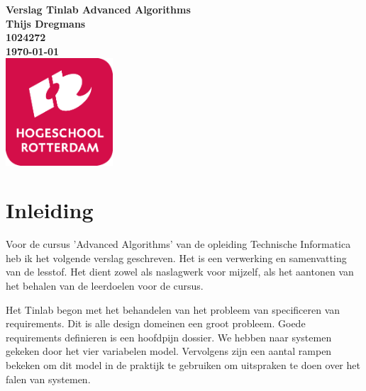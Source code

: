 \documentclass{article}
\begin{document}
	\sffamily
	
	\begin{titlepage}
	
		\centering
		  \vfill
		  {\bfseries\Huge
		    Verslag Tinlab Advanced Algorithms \\
		      \vskip2cm
		    }
		    {\bfseries\Large
		      Thijs Dregmans\\
		    }
		    {
		      \bfseries\normalsize
		      1024272\\
		      \vskip1cm
		      \today\\
		  }    
		  \vfill
		  \includegraphics[width=4cm]{logohr.png} %
		  \vfill
		  \vfill
	    
	\end{titlepage}
	
	\newpage
	
	
	\tableofcontents
	
	\newpage
	
	
	\section{Inleiding}
	
	Voor de cursus 'Advanced Algorithms' van de opleiding Technische Informatica heb ik het volgende verslag geschreven. Het is een verwerking en samenvatting van de lesstof. Het dient zowel als naslagwerk voor mijzelf, als het aantonen van het behalen van de leerdoelen voor de cursus.
	
	Het Tinlab begon met het behandelen van het probleem van specificeren van requirements. Dit is alle design domeinen een groot probleem. Goede requirements definieren is een hoofdpijn dossier. We hebben naar systemen gekeken door het vier variabelen model. Vervolgens zijn een aantal rampen bekeken om dit model in de praktijk te gebruiken om uitspraken te doen over het falen van systemen.
\end{document}
